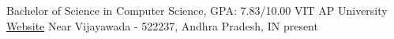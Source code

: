 
\begin{cventries}
  \cventry
    {Bachelor of Science in Computer Science, GPA:  7.83/10.00} %
    {VIT AP University} %
	{\href{https://vitap.ac.in}{Website}}
    {Near Vijayawada - 522237, Andhra Pradesh, IN} %
    {present} %
   { }
\end{cventries}
